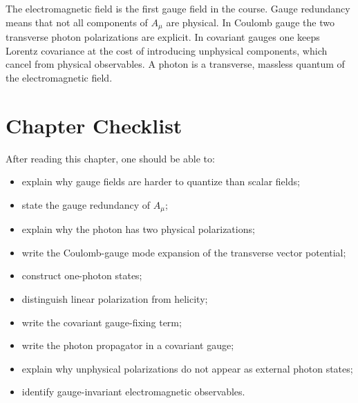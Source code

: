 \begin{summarybox}
The electromagnetic field is the first gauge field in the course. Gauge
redundancy means that not all components of \(A_\mu\) are physical. In Coulomb
gauge the two transverse photon polarizations are explicit. In covariant gauges
one keeps Lorentz covariance at the cost of introducing unphysical components,
which cancel from physical observables. A photon is a transverse, massless
quantum of the electromagnetic field.
\end{summarybox}

\section{Chapter Checklist}

After reading this chapter, one should be able to:
\begin{itemize}
    \item explain why gauge fields are harder to quantize than scalar fields;
    \item state the gauge redundancy of \(A_\mu\);
    \item explain why the photon has two physical polarizations;
    \item write the Coulomb-gauge mode expansion of the transverse vector
    potential;
    \item construct one-photon states;
    \item distinguish linear polarization from helicity;
    \item write the covariant gauge-fixing term;
    \item write the photon propagator in a covariant gauge;
    \item explain why unphysical polarizations do not appear as external photon
    states;
    \item identify gauge-invariant electromagnetic observables.
\end{itemize}
